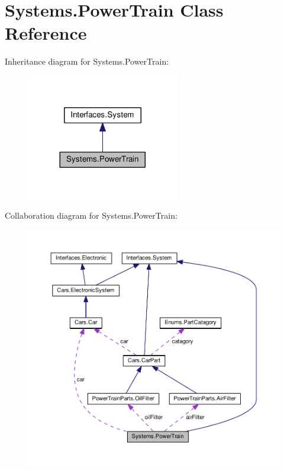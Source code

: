 \hypertarget{classSystems_1_1PowerTrain}{}\section{Systems.\+Power\+Train Class Reference}
\label{classSystems_1_1PowerTrain}


Inheritance diagram for Systems.\+Power\+Train\+:\nopagebreak
\begin{figure}[H]
\begin{center}
\leavevmode
\includegraphics[width=188pt]{classSystems_1_1PowerTrain__inherit__graph}
\end{center}
\end{figure}


Collaboration diagram for Systems.\+Power\+Train\+:\nopagebreak
\begin{figure}[H]
\begin{center}
\leavevmode
\includegraphics[width=350pt]{classSystems_1_1PowerTrain__coll__graph}
\end{center}
\end{figure}
